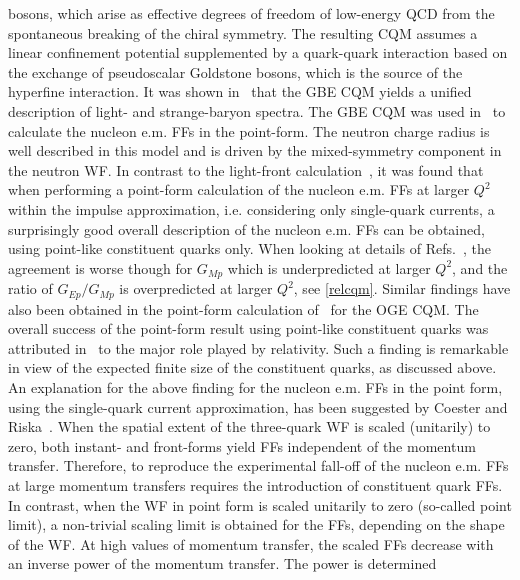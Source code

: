 bosons, which arise as effective degrees of freedom of low-energy QCD 
from the spontaneous breaking of the chiral symmetry. 
The resulting CQM assumes a linear confinement potential supplemented by 
a quark-quark interaction based on the exchange of pseudoscalar 
Goldstone bosons, which is the source of the hyperfine interaction. 
It was shown in~\cite{Glozman:1997fs,Glozman:1997ag}  that the GBE 
CQM yields a unified description of light- and strange-baryon spectra. 
The GBE CQM was used in~\cite{wagenbrunn,boffi} 
to calculate the nucleon e.m. FFs in the point-form. The neutron 
charge radius is well described in this model and is driven 
by the mixed-symmetry component in the neutron WF.  
In contrast to the light-front 
calculation~\cite{cardarelli,pace}, it was found that when performing 
a point-form calculation of the nucleon e.m. FFs at larger $Q^2$ 
within the impulse approximation, 
i.e. considering only single-quark currents, a surprisingly 
good overall description of the nucleon e.m. FFs can be obtained, using  
point-like constituent quarks only. 
When looking at details of Refs.~\cite{wagenbrunn,boffi}, 
the agreement is worse though for $G_{Mp}$ which 
is underpredicted at larger $Q^2$, and the ratio of $G_{Ep}/G_{Mp}$ is 
overpredicted at larger $Q^2$, see \ref{relcqm}. 
Similar findings have also been obtained in the point-form calculation 
of~\cite{Wagenbrunn:2005wk} for the OGE CQM. 
The overall success of the point-form result using point-like constituent 
quarks was attributed in~\cite{wagenbrunn,boffi,Wagenbrunn:2005wk} 
to the major role played by relativity.  
Such a finding is remarkable in view of the expected finite 
size of the constituent quarks, as discussed above.  
\newline
\indent
An explanation for the above finding for the nucleon 
e.m. FFs in the point form, 
using the single-quark current approximation, 
has been suggested by Coester and Riska~\cite{Coester:2003rw}. 
When the spatial extent of the three-quark WF 
is scaled (unitarily) to zero, both  
instant- and front-forms yield FFs independent of the momentum 
transfer. Therefore, to reproduce 
the experimental fall-off of the nucleon e.m. FFs  
at large momentum transfers requires the introduction of constituent quark 
FFs. In contrast, when the WF in point form is scaled unitarily to 
zero (so-called point limit), a non-trivial scaling limit is obtained for 
the FFs, depending on the shape of the WF. 
At high values of momentum transfer, the scaled FFs decrease with an inverse 
power of the momentum transfer. The power is determined 

